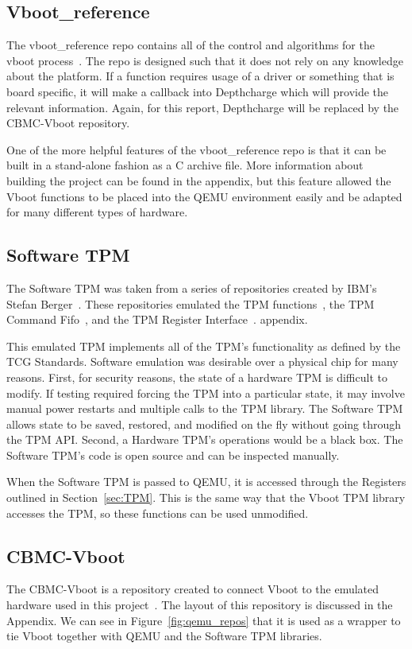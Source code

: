 \subsection{Vboot\_reference}

The vboot\_reference repo contains all of the control and algorithms for the vboot process~\cite{vboot-codebase}.
The repo is designed such that it does not rely on any knowledge about the platform.
If a function requires usage of a driver or something that is board specific, it will make a callback into Depthcharge which will provide the relevant information.
Again, for this report, Depthcharge will be replaced by the CBMC-Vboot
repository.

One of the more helpful features of the vboot\_reference repo is that it can be
built in a stand-alone fashion as a C archive file.
More information about building the project can be found in the appendix, but
this feature allowed the Vboot functions to be placed into the QEMU environment
easily and be adapted for many different types of hardware.

\subsection{Software TPM}

The Software TPM was taken from a series of repositories created by IBM's
Stefan Berger~\cite{SWTPM}. 
These repositories emulated the TPM functions~\cite{TPMLibs}, the TPM Command
Fifo~\cite{SWTPM}, and the TPM Register Interface~\cite{TPMQEMU}. 
appendix.

This emulated TPM implements all of the TPM's functionality as defined by the
TCG Standards.
Software emulation was desirable over a physical chip for many reasons.
First, for security reasons, the state of a hardware TPM is difficult to modify.
If testing required forcing the TPM into a particular state, it may involve
manual power restarts and multiple calls to the TPM library.
The Software TPM allows state to be saved, restored, and modified on the fly
without going through the TPM API.
Second, a Hardware TPM's operations would be a black box.
The Software TPM's code is open source and can be inspected manually.

When the Software TPM is passed to QEMU, it is accessed through the 
Registers outlined in Section~\ref{sec:TPM}.
This is the same way that the Vboot TPM library accesses the TPM, so these
functions can be used unmodified. 

\subsection{CBMC-Vboot}

The CBMC-Vboot is a repository created to connect Vboot to the emulated
hardware used in this project~\cite{my-repo}.
The layout of this repository is discussed in the Appendix.
We can see in Figure~\ref{fig:qemu_repos} that it is used as a wrapper to tie
Vboot together with QEMU and the Software TPM libraries.
